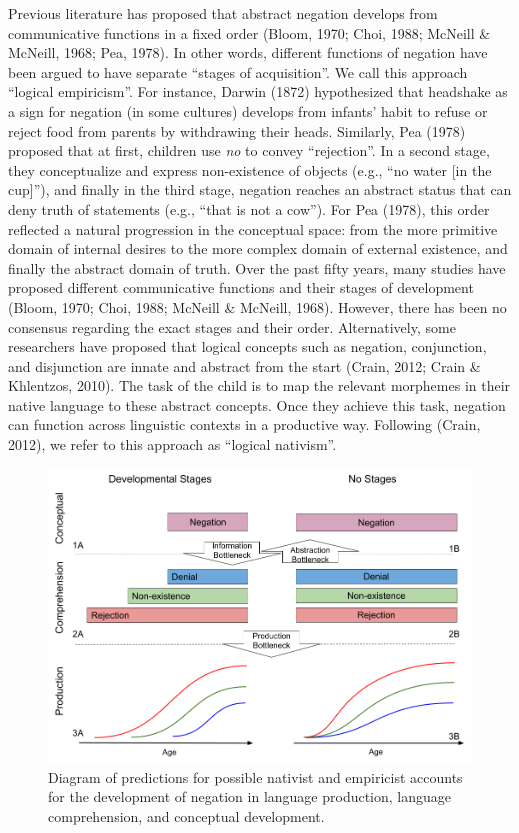 \documentclass[
  man,floatsintext]{apa6}
\begin{document}
Previous literature has proposed that abstract negation develops from communicative functions in a fixed order (Bloom, 1970; Choi, 1988; McNeill \& McNeill, 1968; Pea, 1978). In other words, different functions of negation have been argued to have separate ``stages of acquisition''. We call this approach ``logical empiricism''. For instance, Darwin (1872) hypothesized that headshake as a sign for negation (in some cultures) develops from infants' habit to refuse or reject food from parents by withdrawing their heads. Similarly, Pea (1978) proposed that at first, children use \emph{no} to convey ``rejection''. In a second stage, they conceptualize and express non-existence of objects (e.g., ``no water {[}in the cup{]}''), and finally in the third stage, negation reaches an abstract status that can deny truth of statements (e.g., ``that is not a cow''). For Pea (1978), this order reflected a natural progression in the conceptual space: from the more primitive domain of internal desires to the more complex domain of external existence, and finally the abstract domain of truth. Over the past fifty years, many studies have proposed different communicative functions and their stages of development (Bloom, 1970; Choi, 1988; McNeill \& McNeill, 1968). However, there has been no consensus regarding the exact stages and their order. Alternatively, some researchers have proposed that logical concepts such as negation, conjunction, and disjunction are innate and abstract from the start (Crain, 2012; Crain \& Khlentzos, 2010). The task of the child is to map the relevant morphemes in their native language to these abstract concepts. Once they achieve this task, negation can function across linguistic contexts in a productive way. Following (Crain, 2012), we refer to this approach as ``logical nativism''.

\begin{figure}
\includegraphics[width=1\linewidth]{pics/theory} \caption{Diagram of predictions for possible nativist and empiricist accounts for the development of negation in language production, language comprehension, and conceptual development.}\label{fig:theory}
\end{figure}
\end{document}

